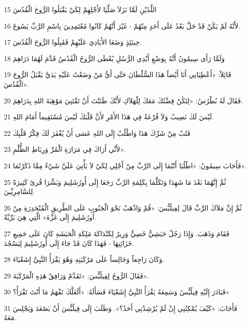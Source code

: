 \par 15 اللَّذَيْنِ لَمَّا نَزَلاَ صَلَّيَا لأَجْلِهِمْ لِكَيْ يَقْبَلُوا الرُّوحَ الْقُدُسَ
\par 16 لأَنَّهُ لَمْ يَكُنْ قَدْ حَلَّ بَعْدُ عَلَى أَحَدٍ مِنْهُمْ - غَيْرَ أَنَّهُمْ كَانُوا مُعْتَمِدِينَ بِاسْمِ الرَّبِّ يَسُوعَ.
\par 17 حِينَئِذٍ وَضَعَا الأَيَادِيَ عَلَيْهِمْ فَقَبِلُوا الرُّوحَ الْقُدُسَ.
\par 18 وَلَمَّا رَأَى سِيمُونُ أَنَّهُ بِوَضْعِ أَيْدِي الرُّسُلِ يُعْطَى الرُّوحُ الْقُدُسُ قَدَّمَ لَهُمَا دَرَاهِمَ
\par 19 قَائِلاً: «أَعْطِيَانِي أَنَا أَيْضاً هَذَا السُّلْطَانَ حَتَّى أَيُّ مَنْ وَضَعْتُ عَلَيْهِ يَدَيَّ يَقْبَلُ الرُّوحَ الْقُدُسَ».
\par 20 فَقَالَ لَهُ بُطْرُسُ: «لِتَكُنْ فِضَّتُكَ مَعَكَ لِلْهَلاَكِ لأَنَّكَ ظَنَنْتَ أَنْ تَقْتَنِيَ مَوْهِبَةَ اللهِ بِدَرَاهِمَ.
\par 21 لَيْسَ لَكَ نَصِيبٌ وَلاَ قُرْعَةٌ فِي هَذَا الأَمْرِ لأَنَّ قَلْبَكَ لَيْسَ مُسْتَقِيماً أَمَامَ اللهِ.
\par 22 فَتُبْ مِنْ شَرِّكَ هَذَا وَاطْلُبْ إِلَى اللهِ عَسَى أَنْ يُغْفَرَ لَكَ فِكْرُ قَلْبِكَ
\par 23 لأَنِّي أَرَاكَ فِي مَرَارَةِ الْمُرِّ وَرِبَاطِ الظُّلْمِ».
\par 24 فَأَجَابَ سِيمُونُ: «اطْلُبَا أَنْتُمَا إِلَى الرَّبِّ مِنْ أَجْلِي لِكَيْ لاَ يَأْتِيَ عَلَيَّ شَيْءٌ مِمَّا ذَكَرْتُمَا».
\par 25 ثُمَّ إِنَّهُمَا بَعْدَ مَا شَهِدَا وَتَكَلَّمَا بِكَلِمَةِ الرَّبِّ رَجَعَا إِلَى أُورُشَلِيمَ وَبَشَّرَا قُرىً كَثِيرَةً لِلسَّامِرِيِّينَ.
\par 26 ثُمَّ إِنَّ مَلاَكَ الرَّبِّ قَالَ لِفِيلُبُّسَ: «قُمْ وَاذْهَبْ نَحْوَ الْجَنُوبِ عَلَى الطَّرِيقِ الْمُنْحَدِرَةِ مِنْ أُورُشَلِيمَ إِلَى غَزَّةَ» الَّتِي هِيَ بَرِّيَّةٌ.
\par 27 فَقَامَ وَذَهَبَ. وَإِذَا رَجُلٌ حَبَشِيٌّ خَصِيٌّ وَزِيرٌ لِكَنْدَاكَةَ مَلِكَةِ الْحَبَشَةِ كَانَ عَلَى جَمِيعِ خَزَائِنِهَا - فَهَذَا كَانَ قَدْ جَاءَ إِلَى أُورُشَلِيمَ لِيَسْجُدَ.
\par 28 وَكَانَ رَاجِعاً وَجَالِساً عَلَى مَرْكَبَتِهِ وَهُوَ يَقْرَأُ النَّبِيَّ إِشَعْيَاءَ.
\par 29 فَقَالَ الرُّوحُ لِفِيلُبُّسَ: «تَقَدَّمْ وَرَافِقْ هَذِهِ الْمَرْكَبَةَ».
\par 30 فَبَادَرَ إِلَيْهِ فِيلُبُّسُ وَسَمِعَهُ يَقْرَأُ النَّبِيَّ إِشَعْيَاءَ فَسَأَلَهُ: «أَلَعَلَّكَ تَفْهَمُ مَا أَنْتَ تَقْرَأُ؟»
\par 31 فَأَجَابَ: «كَيْفَ يُمْكِنُنِي إِنْ لَمْ يُرْشِدْنِي أَحَدٌ؟». وَطَلَبَ إِلَى فِيلُبُّسَ أَنْ يَصْعَدَ وَيَجْلِسَ مَعَهُ.
